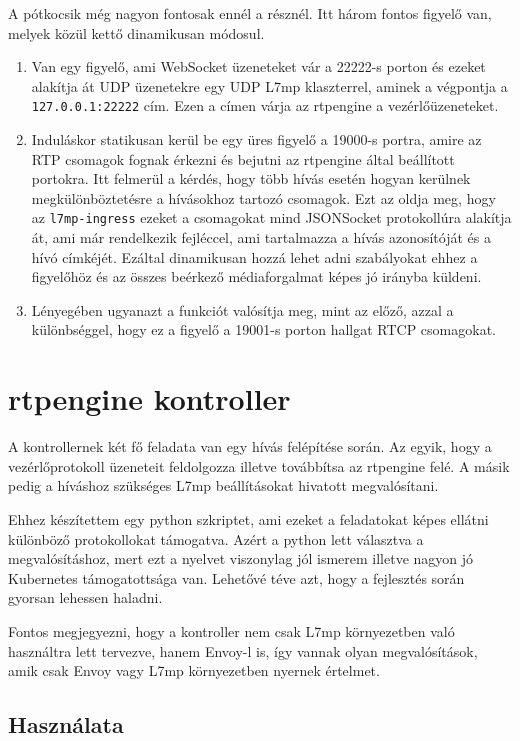 A pótkocsik még nagyon fontosak ennél a résznél. Itt három fontos figyelő van, melyek 
közül kettő dinamikusan módosul.

\begin{enumerate}
	\item Van egy figyelő, ami WebSocket üzeneteket vár a 22222-s porton és ezeket 
	alakítja át UDP üzenetekre egy UDP L7mp klaszterrel, aminek a végpontja a 
	\texttt{127.0.0.1:22222} cím. Ezen a címen várja az rtpengine a vezérlőüzeneteket. 
	\item Induláskor statikusan kerül be egy üres figyelő a 19000-s portra, amire az RTP 
	csomagok fognak érkezni és bejutni az rtpengine által beállított portokra. Itt 
	felmerül a kérdés, hogy több hívás esetén hogyan kerülnek megkülönböztetésre a 
	hívásokhoz tartozó csomagok. Ezt az oldja meg, hogy az \texttt{l7mp-ingress} ezeket a 
	csomagokat mind JSONSocket protokollúra alakítja át, ami már rendelkezik fejléccel, 
	ami tartalmazza a hívás azonosítóját és a hívó címkéjét. Ezáltal dinamikusan hozzá 
	lehet adni szabályokat ehhez a figyelőhöz és az összes beérkező médiaforgalmat képes 
	jó irányba küldeni. 
	\item Lényegében ugyanazt a funkciót valósítja meg, mint az előző, azzal a 
	különbséggel, hogy ez a figyelő a 19001-s porton hallgat RTCP csomagokat. 
\end{enumerate}

\section{rtpengine kontroller}\label{sec:controller}

A kontrollernek két fő feladata van egy hívás felépítése során. Az egyik, hogy
a vezérlőprotokoll üzeneteit feldolgozza illetve továbbítsa az rtpengine
felé. A másik pedig a híváshoz szükséges L7mp beállításokat hivatott 
megvalósítani.

Ehhez készítettem egy python szkriptet, ami ezeket a feladatokat képes ellátni
különböző protokollokat támogatva. Azért a python lett választva a megvalósításhoz,
mert ezt a nyelvet viszonylag jól ismerem illetve nagyon jó Kubernetes 
támogatottsága van. Lehetővé téve azt, hogy a fejlesztés során gyorsan lehessen haladni.

Fontos megjegyezni, hogy a kontroller nem csak L7mp környezetben való használtra lett
tervezve, hanem Envoy-l is, így vannak olyan megvalósítások, amik csak Envoy
vagy L7mp környezetben nyernek értelmet. 

\subsection{Használata}

